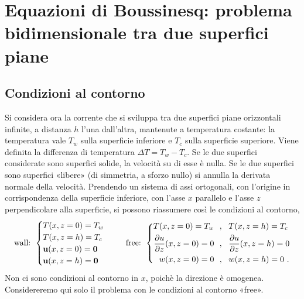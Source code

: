 \documentclass[letterpaper,10pt,italian]{jupyterBook}
\begin{document}
\section{Equazioni di Boussinesq: problema bidimensionale tra due superfici piane}
\label{\detokenize{polimi/fluidmechanics-ita/template/capitoli/07_similitudine/07teoria:equazioni-di-boussinesq-problema-bidimensionale-tra-due-superfici-piane}}

\subsection{Condizioni al contorno}
\label{\detokenize{polimi/fluidmechanics-ita/template/capitoli/07_similitudine/07teoria:condizioni-al-contorno}}
\sphinxAtStartPar
Si considera ora la corrente che si sviluppa tra due superfici piane
orizzontali infinite, a distanza \(h\) l’una dall’altra, mantenute a
temperatura costante: la temperatura vale \(T_w\) sulla superficie
inferiore e \(T_c\) sulla superficie superiore. Viene definita la
differenza di temperatura \(\Delta T = T_w - T_c\). Se le due superfici
considerate sono superfici solide, la velocità su di esse è nulla. Se le
due superfici sono superfici «libere» (di simmetria, a sforzo nullo) si
annulla la derivata normale della velocità. Prendendo un sistema di assi
ortogonali, con l’origine in corrispondenza della superficie inferiore,
con l’asse \(x\) parallelo e l’asse \(z\) perpendicolare alla superficie, si
possono riassumere così le condizioni al contorno,
\begin{equation*}
\begin{split}\text{wall: }
    \begin{cases}
      T(x,z=0) = T_w \\ T(x,z=h) = T_c \\
      \mathbf{u}(x,z=0) = \mathbf{0} \\ \mathbf{u}(x,z=h) = \mathbf{0}
    \end{cases}  \hspace{0.5cm}
    \text{free: } \left\{
    \begin{aligned}
      T(x,z=0) = T_w \ & \ , \ \ T(x,z=h) = T_c \\
      \dfrac{\partial u}{\partial z}(x,z=0) = 0 \ & \ , \ \ \dfrac{\partial u}{\partial z}(x,z=h) = 0 \\
      w(x,z=0) = 0 \ & \  , \  \  w(x,z=h) = 0 \ .
    \end{aligned} \right.\end{split}
\end{equation*}
\sphinxAtStartPar
Non ci sono condizioni al contorno in \(x\),
poichè la direzione è omogenea. Considereremo qui solo il problema con
le condizioni al contorno «free».
\end{document}
